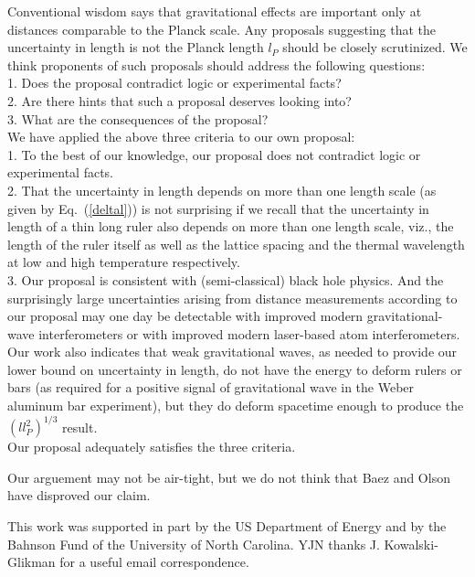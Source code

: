 \documentclass[preprint2]{aastex}
\begin{document}
Conventional wisdom says that gravitational effects are important only
at distances comparable to the Planck scale.  Any proposals suggesting
that the uncertainty in length is not the Planck length $l_P$
should be closely scrutinized.  We think proponents of such proposals
should address the following questions:\\
1. Does the proposal contradict logic or experimental facts?\\
2. Are there hints that such a proposal deserves looking into?\\
3. What are the consequences of the proposal?\\
We have applied the above three criteria to our own proposal:\\
1. To the
best of our knowledge, our proposal does not contradict logic or
experimental facts.\\
2. That the uncertainty in length depends on more than one length scale
(as given by Eq.~(\ref{deltal})) is not surprising if we
recall\citep{ngy95} that the uncertainty in length of a thin long ruler
also depends on more than one length scale, viz., the length of the ruler
itself as well as the lattice spacing and the thermal
wavelength at low and high temperature respectively.\\
3. Our proposal is consistent with (semi-classical) black hole physics.
And the surprisingly large uncertainties arising from
distance measurements according to our proposal may one day be
detectable with improved modern gravitational-wave
interferometers\citep{ame99,ngy00b} or with improved modern laser-based
atom interferometers\citep{ngy02}.  Our work\citep{ngy97,ngy00a} also
indicates that weak gravitational waves, as needed to provide our
lower bound on uncertainty in length, do not have the energy to deform
rulers or bars
(as required for a positive signal of gravitational wave
in the Weber aluminum bar experiment), but they do deform spacetime
enough to produce the $(l l_P^2)^{1/3}$ result.\\
Our proposal adequately satisfies the three criteria.

Our arguement may not be air-tight, but we
do not think that Baez and Olson\citep{bae02} have disproved our claim.


\acknowledgments

This work was supported in part by the US Department of Energy
and by
the Bahnson Fund of the University of North Carolina.
YJN thanks J. Kowalski-Glikman for a useful email correspondence.
\end{document}
